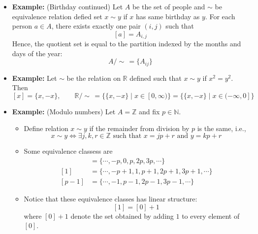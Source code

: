 \documentclass[11pt,twoside]{report}
\newcommand{\bbN}{{\mathbb{N}}}
\newcommand{\bbR}{{\mathbb{R}}}
\newcommand{\bbZ}{{\mathbb{Z}}}
\begin{document}
\begin{itemize}
\item \textbf{Example:} (Birthday continued) Let $A$ be the set of people  and $\sim$ be equivalence relation defied  set $x \sim y$ if $x$ has same birthday as $y$. For each person $a\in A$, there exists exactly one pair $(i, j)$ such that 
\[
[a]  = A_{i,j} 
\]
Hence, the quotient set is equal to the partition indexed by the months and days of the year: 
\[
A /\sim \,   = \{ A_{ij} \} 
\]


\item \textbf{Example:} Let $\sim$ be the relation on $\bbR$ defined such that $x\sim y$ if $x^2 = y^2$. Then
\[
[x] = \{ x , - x\}, \qquad \bbR /\sim\,   %
= \{ \{ x, - x\} \mid x \in [0, \infty)\} =  \{ \{ x, - x\} \mid x \in (-\infty, 0]\} 
\]


\item \textbf{Example:} (Modulo numbers)  Let $A = \bbZ$ and fix $p \in\bbN$. 
\begin{itemize}
\item Define relation $x\sim y $ if the remainder from division by $p$ is the same, i.e., 
\[
x \sim y  \iff  \text{$\exists j,k,r \in \bbZ$  such that $x = jp +r$ and $y = kp + r$}
\]

\item Some  equivalence classess are
\begin{align*}
[0]  &= \{ \cdots , - p, 0, p, 2p, 3p, \cdots\} \\
[1]  &= \{ \cdots , - p+1, 1, p+1, 2p+1, 3p+1, \cdots\} \\
[p-1]  &= \{ \cdots , - 1, p-1, 2p-1, 3p-1, \cdots\} 
\end{align*}

\item Notice that these equivalence classes has linear structure: 
\[
[1] = [0] +1
\]
where $[0]+1$ denote the set obtained by adding $1$ to every element of $[0]$. 
\end{itemize}



\end{itemize}
\end{document}
